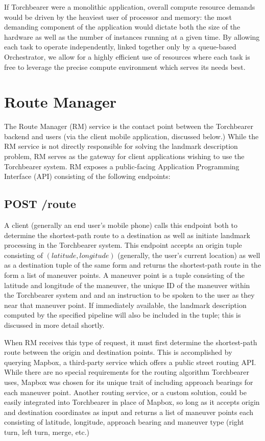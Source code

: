 If Torchbearer were a monolithic application, overall compute resource demands would be driven by the heaviest user of processor and memory: the most demanding component of the application would dictate both the size of the hardware as well as the number of instances running at a given time. By allowing each task to operate independently, linked together only by a queue-based Orchestrator, we allow for a highly efficient use of resources where each task is free to leverage the precise compute environment which serves its needs best.

\section{Route Manager}
The Route Manager (RM) service is the contact point between the Torchbearer backend and users (via the client mobile application, discussed below.) While the RM service is not directly responsible for solving the landmark description problem, RM serves as the gateway for client applications wishing to use the Torchbearer system. RM exposes a public-facing Application Programming Interface (API) consisting of the following endpoints:

\subsection{POST /route}
A client (generally an end user's mobile phone) calls this endpoint both to determine the shortest-path route to a destination as well as initiate landmark processing in the Torchbearer system. This endpoint accepts an origin tuple consisting of $(latitude, longitude)$ (generally, the user’s current location) as well as a destination tuple of the same form and returns the shortest-path route in the form a list of maneuver points. A maneuver point is a tuple consisting of the latitude and longitude of the maneuver, the unique ID of the maneuver within the Torchbearer system and and an instruction to be spoken to the user as they near that maneuver point. If immediately available, the landmark description computed by the specified pipeline will also be included in the tuple; this is discussed in more detail shortly.

When RM receives this type of request, it must first determine the shortest-path route between the origin and destination points. This is accomplished by querying Mapbox, a third-party service which offers a public street routing API. While there are no special requirements for the routing algorithm Torchbearer uses, Mapbox was chosen for its unique trait of including approach bearings for each maneuver point. Another routing service, or a custom solution, could be easily integrated into Torchbearer in place of Mapbox, so long as it accepts origin and destination coordinates as input and returns a list of maneuver points each consisting of latitude, longitude, approach bearing and maneuver type (right turn, left turn, merge, etc.)

